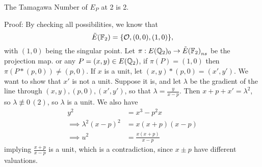 \documentclass[12pt, a4paper]{amsart}
\begin{document}
\begin{thm}
  The Tamagawa Number of $E_P$ at 2 is 2.
\end{thm}
Proof: By checking all possibilities, we know that
\[{\tilde{E}(\mathbb{F}_2)} = \{{\mathcal O}, (0,0), (1,0)\},\]
with $(1,0)$ being the singular point. Let $\pi : E({\mathbb Q}_2)_0 \rightarrow
{\tilde{E}(\mathbb{F}_2)}_{ns}$ be the projection map. 
or any $P = (x,y) \in E({\mathbb Q}_2)$, if $\pi(P) = (1,0)$ then $\pi(P * (p,0)) \neq (p,0)$.
If $x$ is a unit, let $(x,y) * (p,0) = (x',y')$. We want to show that $x'$ is
not a unit. Suppose it is, and let $\lambda$ be the gradient of the line through
$(x,y), (p,0), (x',y')$, so that $\lambda = \frac{y}{x-p}$.
Then $x + p + x' = \lambda^2$, so $\lambda \not\equiv 0 \, (2)$, so $\lambda$ is
a unit. We also have
\[
  \begin{split}
     y^2 &= x^3 - p^2x \\
     \implies \lambda^2(x-p)^2 &= x (x+p) (x-p) \\
     \implies u^2 &= \frac{x (x+p)}{x-p} 
   \end{split}
\]
implying $\frac{x+p}{x-p}$ is a unit, which is a contradiction, since
$x \pm p$ have different valuations.

\printbibliography
\end{document}
